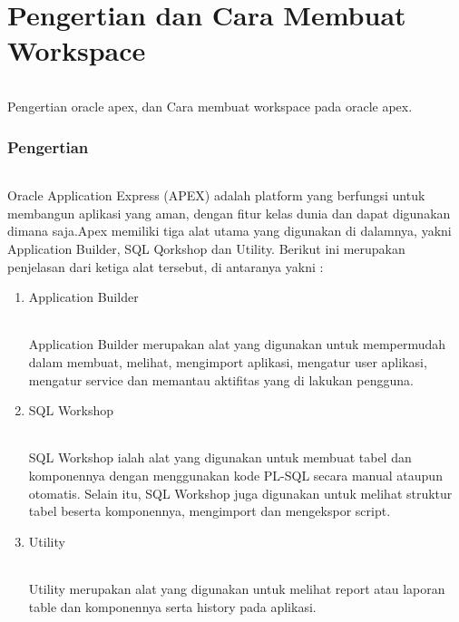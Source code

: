 \clearpage
\setcounter{page}{1}
\part{Pengertian dan Cara Membuat Workspace}
\paragraph{}
Pengertian oracle apex, dan Cara membuat workspace pada oracle apex.
\section{Pengertian}
\paragraph{}
Oracle Application Express (APEX) adalah platform yang berfungsi untuk membangun aplikasi yang aman, dengan fitur kelas dunia dan dapat digunakan dimana saja.Apex memiliki tiga alat utama yang digunakan di dalamnya, yakni Application Builder, SQL Qorkshop dan Utility. Berikut ini merupakan penjelasan dari ketiga alat tersebut, di antaranya yakni :
\begin{enumerate}
    \item Application Builder
    \paragraph{} Application Builder merupakan alat yang digunakan untuk mempermudah dalam membuat, melihat, mengimport aplikasi, mengatur user aplikasi, mengatur service dan memantau aktifitas yang di lakukan pengguna.
    \item SQL Workshop
    \paragraph{} SQL Workshop ialah alat yang digunakan untuk membuat tabel dan komponennya dengan menggunakan kode PL-SQL secara manual ataupun otomatis. Selain itu, SQL Workshop juga digunakan untuk melihat struktur tabel beserta komponennya, mengimport dan mengekspor script.
    \item Utility
    \paragraph{} Utility merupakan alat yang digunakan untuk melihat report atau laporan table dan komponennya serta history pada aplikasi.
\end{enumerate}
